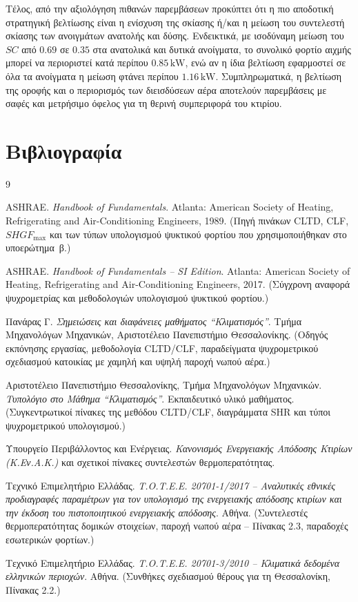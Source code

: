 \documentclass[12pt,a4paper]{article}
\begin{document}
Τέλος, από την αξιολόγηση πιθανών παρεμβάσεων προκύπτει ότι η πιο αποδοτική
στρατηγική βελτίωσης είναι η ενίσχυση της σκίασης ή/και η μείωση του συντελεστή
σκίασης των ανοιγμάτων ανατολής και δύσης. Ενδεικτικά, με ισοδύναμη μείωση του
\(SC\) από \(0.69\) σε \(0.35\) στα ανατολικά και δυτικά ανοίγματα, το συνολικό
φορτίο αιχμής μπορεί να περιοριστεί κατά περίπου \(0.85\,\mathrm{kW}\), ενώ αν η
ίδια βελτίωση εφαρμοστεί σε όλα τα ανοίγματα η μείωση φτάνει περίπου
\(1.16\,\mathrm{kW}\). Συμπληρωματικά, η βελτίωση της οροφής και ο
περιορισμός των διεισδύσεων αέρα αποτελούν παρεμβάσεις με σαφές και μετρήσιμο
όφελος για τη θερινή συμπεριφορά του κτιρίου.

\section{Βιβλιογραφία}

\begin{thebibliography}{9}

\textenglish{ASHRAE}. \textit{Handbook of Fundamentals}. Atlanta: American Society
of Heating, Refrigerating and Air-Conditioning Engineers, 1989. (Πηγή πινάκων
\textenglish{CLTD}, \textenglish{CLF}, \(SHGF_{\max}\) και των τύπων υπολογισμού
ψυκτικού φορτίου που χρησιμοποιήθηκαν στο υποερώτημα~β.)

\textenglish{ASHRAE}. \textit{Handbook of Fundamentals -- SI Edition}. Atlanta:
American Society of Heating, Refrigerating and Air-Conditioning Engineers, 2017.
(Σύγχρονη αναφορά ψυχρομετρίας και μεθοδολογιών υπολογισμού ψυκτικού φορτίου.)

Πανάρας Γ. \textit{Σημειώσεις και διαφάνειες μαθήματος ``Κλιματισμός''}. Τμήμα
Μηχανολόγων Μηχανικών, Αριστοτέλειο Πανεπιστήμιο Θεσσαλονίκης. (Οδηγός εκπόνησης
εργασίας, μεθοδολογία \textenglish{CLTD/CLF}, παραδείγματα ψυχρομετρικού
σχεδιασμού κατοικίας με χαμηλή και υψηλή παροχή νωπού αέρα.)

Αριστοτέλειο Πανεπιστήμιο Θεσσαλονίκης, Τμήμα Μηχανολόγων Μηχανικών.
\textit{Τυπολόγιο στο Μάθημα ``Κλιματισμός''}. Εκπαιδευτικό υλικό μαθήματος.
(Συγκεντρωτικοί πίνακες της μεθόδου \textenglish{CLTD/CLF}, διαγράμματα
\textenglish{SHR} και τύποι ψυχρομετρικού υπολογισμού.)

Υπουργείο Περιβάλλοντος και Ενέργειας. \textit{Κανονισμός Ενεργειακής Απόδοσης
Κτιρίων (Κ.Εν.Α.Κ.)} και σχετικοί πίνακες συντελεστών θερμοπερατότητας.

Τεχνικό Επιμελητήριο Ελλάδας. \textit{Τ.Ο.Τ.Ε.Ε. 20701-1/2017 -- Αναλυτικές εθνικές
προδιαγραφές παραμέτρων για τον υπολογισμό της ενεργειακής απόδοσης κτιρίων και την
έκδοση του πιστοποιητικού ενεργειακής απόδοσης}. Αθήνα. (Συντελεστές θερμοπερατότητας
δομικών στοιχείων, παροχή νωπού αέρα -- Πίνακας 2.3, παραδοχές εσωτερικών φορτίων.)

Τεχνικό Επιμελητήριο Ελλάδας. \textit{Τ.Ο.Τ.Ε.Ε. 20701-3/2010 -- Κλιματικά δεδομένα
ελληνικών περιοχών}. Αθήνα. (Συνθήκες σχεδιασμού θέρους για τη Θεσσαλονίκη,
Πίνακας 2.2.)

\end{thebibliography}
\end{document}
